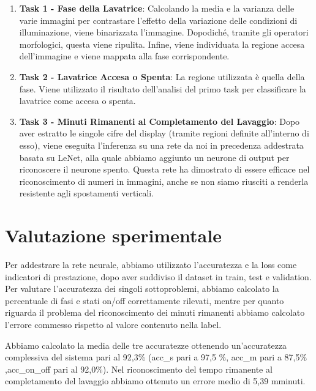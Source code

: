 \documentclass{article}
\begin{document}
\begin{enumerate}
\item
  \textbf{Task 1 - Fase della Lavatrice}: Calcolando la media e la
  varianza delle varie immagini per contrastare l'effetto della
  variazione delle condizioni di illuminazione, viene binarizzata
  l'immagine. Dopodiché, tramite gli operatori morfologici, questa viene
  ripulita. Infine, viene individuata la regione accesa dell'immagine e
  viene mappata alla fase corrispondente.
\item
  \textbf{Task 2 - Lavatrice Accesa o Spenta}: La regione utilizzata è
  quella della fase. Viene utilizzato il risultato dell'analisi del
  primo task per classificare la lavatrice come accesa o spenta.
\item
  \textbf{Task 3 - Minuti Rimanenti al Completamento del Lavaggio}: Dopo
  aver estratto le singole cifre del display (tramite regioni definite
  all'interno di esso), viene eseguita l'inferenza su una rete da noi in
  precedenza addestrata basata su LeNet, alla quale abbiamo aggiunto un
  neurone di output per riconoscere il neurone spento. Questa rete ha
  dimostrato di essere efficace nel riconoscimento di numeri in
  immagini, anche se non siamo riusciti a renderla resistente agli
  spostamenti verticali.
\end{enumerate}

\section{Valutazione sperimentale}\label{valutazione-sperimentale}

\par Per addestrare la rete neurale, abbiamo utilizzato l'accuratezza e la
loss come indicatori di prestazione, dopo aver suddiviso il dataset in
train, test e validation. Per valutare l'accuratezza dei singoli
sottoproblemi, abbiamo calcolato la percentuale di fasi e stati on/off
correttamente rilevati, mentre per quanto riguarda il problema del
riconoscimento dei minuti rimanenti abbiamo calcolato l'errore commesso
rispetto al valore contenuto nella label.

\par Abbiamo calcolato la media delle tre accuratezze ottenendo
un'accuratezza complessiva del sistema pari al 92,3\% (acc\_s pari a 97,5
\%, acc\_m pari a 87,5\% ,acc\_on\_off pari al 92,0\%). Nel riconoscimento del tempo rimanente al completamento del lavaggio abbiamo ottenuto un errore medio di 5,39 mminuti. 
\end{document}
